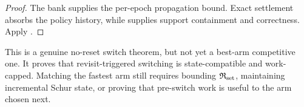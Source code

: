 \begin{proof}
The bank supplies the per-epoch propagation bound.  Exact settlement absorbs
the policy history, while  supplies support
containment and correctness.  Apply
.
\end{proof}

This is a genuine no-reset switch theorem, but not yet a best-arm competitive
one.  It proves that revisit-triggered switching is state-compatible and
work-capped.  Matching the fastest arm still requires bounding
$\mathfrak R_{\rm set}$, maintaining incremental Schur state, or proving that
pre-switch work is useful to the arm chosen next.
